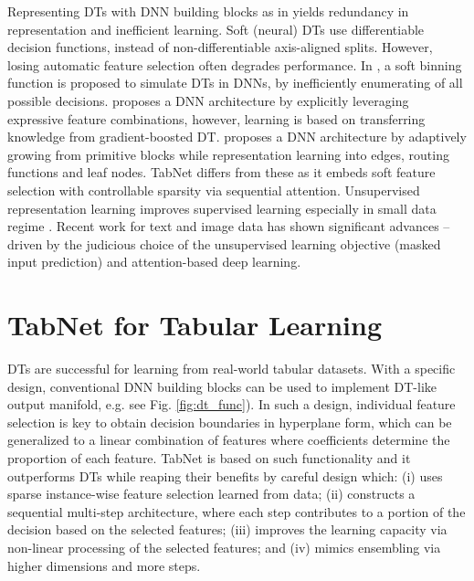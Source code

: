 Representing DTs with DNN building blocks as in \citep{DNN_init_tree} yields redundancy in representation and inefficient learning. 
Soft (neural) DTs \citep{neural_randomforest,neural_decisionforest} use differentiable decision functions, instead of non-differentiable axis-aligned splits. 
However, losing automatic feature selection often degrades performance. 
In \citep{dndt}, a soft binning function is proposed to simulate DTs in DNNs, by inefficiently enumerating of all possible decisions. 
\citep{tabnn} proposes a DNN architecture by explicitly leveraging expressive feature combinations, however, learning is based on transferring knowledge from gradient-boosted DT.
\citep{ant} proposes a DNN architecture by adaptively growing from primitive blocks while representation learning into edges, routing functions and leaf nodes. 
TabNet differs from these as it embeds soft feature selection with controllable sparsity via sequential attention. 
\noindent{}
Unsupervised representation learning improves supervised learning especially in small data regime \citep{self_taught}. 
Recent work for text \citep{bert} and image \citep{selfie} data has shown significant advances -- driven by the judicious choice of the unsupervised learning objective (masked input prediction) and attention-based deep learning.

\section{TabNet for Tabular Learning}

DTs are successful for learning from real-world tabular datasets. 
With a specific design, conventional DNN building blocks can be used to implement DT-like output manifold, e.g. see Fig. \ref{fig:dt_func}).
In such a design, individual feature selection is key to obtain decision boundaries in hyperplane form, which can be generalized to a linear combination of features where coefficients determine the proportion of each feature. 
TabNet is based on such functionality and it outperforms DTs while reaping their benefits by careful design which:
(i) uses sparse instance-wise feature selection learned from data; 
(ii) constructs a sequential multi-step architecture, where each step contributes to a portion of the decision based on the selected features;
(iii) improves the learning capacity via non-linear processing of the selected features; and 
(iv) mimics ensembling via higher dimensions and more steps.

